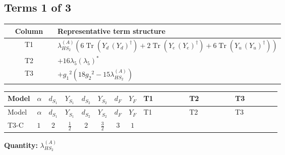 \documentclass[8pt]{article}
\begin{document}
\begin{landscape}
\subsection*{Terms 1 of 3}
\begin{center}
\begin{tabular}{@{}c >{\raggedright\arraybackslash}p{0.82\linewidth}@{}}
\toprule
Column & Representative term structure \\
\midrule
T1 & \(\displaystyle {\lambda_{HS_2}^{(A)}} (6 \operatorname{Tr}\!\left({Y_d}\,\left({Y_d}\right)^{\dagger}\right)+2 \operatorname{Tr}\!\left({Y_e}\,\left({Y_e}\right)^{\dagger}\right)+6 \operatorname{Tr}\!\left({Y_u}\,\left({Y_u}\right)^{\dagger}\right))\) \\
\midrule
T2 & \(\displaystyle +16 {\lambda_5} \left({\lambda_5}\right)^{*}\) \\
\midrule
T3 & \(\displaystyle +{g_1}^2 \left(18 {g_2}^2-15 {\lambda_{HS_2}^{(A)}}\right)\) \\
\midrule
\bottomrule
\end{tabular}
\end{center}
\smallskip
\tiny
\begin{longtable}{@{}llcccccc >{\raggedright\arraybackslash}p{0.21\linewidth} >{\raggedright\arraybackslash}p{0.21\linewidth} >{\raggedright\arraybackslash}p{0.21\linewidth}@{}}
\toprule
Model & $\alpha$ & $d_{S_1}$ & $Y_{S_1}$ & $d_{S_2}$ & $Y_{S_2}$ & $d_F$ & $Y_F$ & T1 & T2 & T3 \\
\midrule
\endfirsthead
\toprule
Model & $\alpha$ & $d_{S_1}$ & $Y_{S_1}$ & $d_{S_2}$ & $Y_{S_2}$ & $d_F$ & $Y_F$ & T1 & T2 & T3 \\
\midrule
\endhead
T3-C & $1$ & $2$ & $\frac{1}{2}$ & $2$ & $\frac{3}{2}$ & $3$ & $1$ & \scriptsize\adjustbox{max width=\linewidth}{$\begin{gathered} {\lambda_{HS_2}^{(A)}} (6 \operatorname{Tr}\!\left({Y_d}\,\left({Y_d}\right)^{\dagger}\right)+2 \operatorname{Tr}\!\left({Y_e}\,\left({Y_e}\right)^{\dagger}\right)+6 \operatorname{Tr}\!\left({Y_u}\,\left({Y_u}\right)^{\dagger}\right))\end{gathered}$} & \scriptsize\adjustbox{max width=\linewidth}{$\begin{gathered} +16 {\lambda_5} \left({\lambda_5}\right)^{*}\end{gathered}$} & \scriptsize\adjustbox{max width=\linewidth}{$\begin{gathered} +{g_1}^2 \left(18 {g_2}^2-15 {\lambda_{HS_2}^{(A)}}\right)\end{gathered}$} \\
\midrule
\bottomrule
\end{longtable}
\clearpage
\noindent\textbf{Quantity: }$\lambda_{HS_2}^{(A)}$\par\smallskip

\end{landscape}
\end{document}
